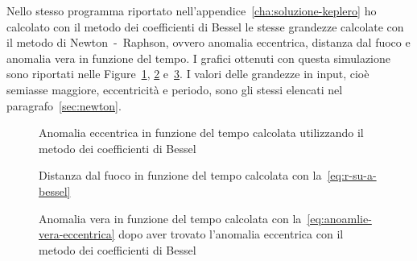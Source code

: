 Nello stesso programma riportato nell'appendice~\ref{cha:soluzione-keplero} ho
calcolato con il metodo dei coefficienti di Bessel le stesse grandezze calcolate
con il metodo di Newton~-~Raphson, ovvero anomalia eccentrica, distanza dal
fuoco e anomalia vera in funzione del tempo. I grafici ottenuti con questa
simulazione sono riportati nelle Figure~\ref{fig:bessel-anomalia_eccentrica},
\ref{fig:bessel-raggio} e~\ref{fig:bessel-anomalia_vera}. I valori delle
grandezze in input, cioè semiasse maggiore, eccentricità e periodo, sono gli
stessi elencati nel paragrafo~\ref{sec:newton}.

\begin{figure}
  \centering
  
  \caption[Anomalia eccentrica in funzione del tempo con il metodo dei
  coefficienti di Bessel]{Anomalia eccentrica in funzione del tempo calcolata
    utilizzando il metodo dei coefficienti di Bessel}
  \label{fig:bessel-anomalia_eccentrica}
\end{figure}
\begin{figure}
  \centering
  
  \caption[Distanza dal fuoco in funzione del tempo con il metodo dei
  coefficienti di Bessel]{Distanza dal fuoco in funzione del tempo calcolata con
    la~\eqref{eq:r-su-a-bessel}}
  \label{fig:bessel-raggio}
\end{figure}
\begin{figure}
  \centering
  
  \caption[Anomalia vera in funzione del tempo con il metodo dei coefficienti di
  Bessel]{Anomalia vera in funzione del tempo calcolata con
    la~\eqref{eq:anoamlie-vera-eccentrica} dopo aver trovato l'anomalia
    eccentrica con il metodo dei coefficienti di Bessel}
  \label{fig:bessel-anomalia_vera}
\end{figure}

